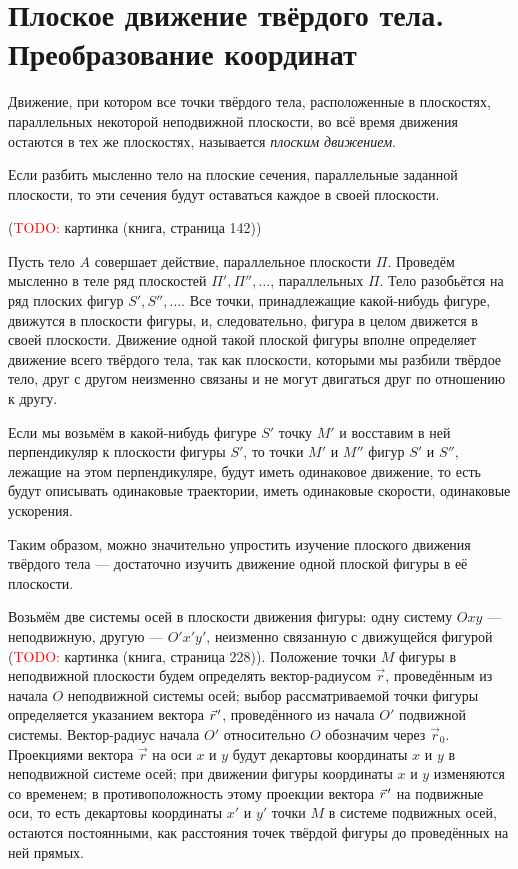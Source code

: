 \section{Плоское движение твёрдого тела. Преобразование координат}

\begin{definition}
  Движение, при котором все точки твёрдого тела, расположенные в плоскостях,
  параллельных некоторой неподвижной плоскости, во всё время движения остаются в
  тех же плоскостях, называется \textit{плоским движением}.

  Если разбить мысленно тело на плоские сечения, параллельные заданной
  плоскости, то эти сечения будут оставаться каждое в своей плоскости.

  (\textcolor{red}{TODO:} картинка (книга, страница 142))
\end{definition}

Пусть тело $A$ совершает действие, параллельное плоскости $\Pi$. Проведём
мысленно в теле ряд плоскостей $\Pi', \Pi'', \dots$, параллельных $\Pi$. Тело
разобьётся на ряд плоских фигур $S', S'', \dots$. Все точки, принадлежащие
какой-нибудь фигуре, движутся в плоскости фигуры, и, следовательно, фигура в
целом движется в своей плоскости. Движение одной такой плоской фигуры вполне
определяет движение всего твёрдого тела, так как плоскости, которыми мы разбили
твёрдое тело, друг с другом неизменно связаны и не могут двигаться друг по
отношению к другу.

Если мы возьмём в какой-нибудь фигуре $S'$ точку $M'$ и восставим в ней
перпендикуляр к плоскости фигуры $S'$, то точки $M'$ и $M''$ фигур $S'$ и $S''$,
лежащие на этом перпендикуляре, будут иметь одинаковое движение, то есть будут
описывать одинаковые траектории, иметь одинаковые скорости, одинаковые
ускорения.

Таким образом, можно значительно упростить изучение плоского движения твёрдого
тела --- достаточно изучить движение одной плоской фигуры в её плоскости.

Возьмём две системы осей в плоскости движения фигуры: одну систему $Oxy$ ---
неподвижную, другую --- $O'x'y'$, неизменно связанную с движущейся фигурой
(\textcolor{red}{TODO:} картинка (книга, страница 228)). Положение точки $M$
фигуры в неподвижной плоскости будем определять вектор-радиусом $\vec{r}$,
проведённым из начала $O$ неподвижной системы осей; выбор рассматриваемой точки
фигуры определяется указанием вектора $\pvec{r}$, проведённого из начала $O'$
подвижной системы. Вектор-радиус начала $O'$ относительно $O$ обозначим через
$\vec{r}_0$. Проекциями вектора $\vec{r}$ на оси $x$ и $y$ будут декартовы
координаты $x$ и $y$ в неподвижной системе осей; при движении фигуры координаты
$x$ и $y$ изменяются со временем; в противоположность этому проекции вектора
$\pvec{r}$ на подвижные оси, то есть декартовы координаты $x'$ и $y'$ точки $M$
в системе подвижных осей, остаются постоянными, как расстояния точек твёрдой
фигуры до проведённых на ней прямых.

